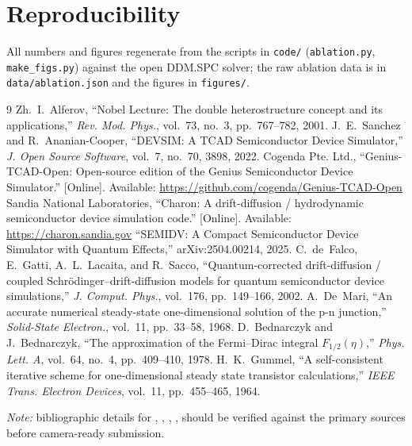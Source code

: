 \documentclass[conference]{IEEEtran}
\begin{document}
\section*{Reproducibility}
All numbers and figures regenerate from the scripts in \texttt{code/}
(\texttt{ablation.py}, \texttt{make\_figs.py}) against the open DDM.SPC solver; the
raw ablation data is in \texttt{data/ablation.json} and the figures in
\texttt{figures/}.

\begin{thebibliography}{9}
 Zh.~I.~Alferov, ``Nobel Lecture: The double heterostructure
concept and its applications,'' \emph{Rev. Mod. Phys.}, vol.~73, no.~3,
pp.~767--782, 2001.
 J.~E.~Sanchez and R.~Ananian-Cooper, ``DEVSIM: A TCAD
Semiconductor Device Simulator,'' \emph{J. Open Source Software}, vol.~7, no.~70,
3898, 2022.
 Cogenda Pte. Ltd., ``Genius-TCAD-Open: Open-source edition of the
Genius Semiconductor Device Simulator.'' [Online]. Available:
\url{https://github.com/cogenda/Genius-TCAD-Open}
 Sandia National Laboratories, ``Charon: A drift-diffusion /
hydrodynamic semiconductor device simulation code.'' [Online]. Available:
\url{https://charon.sandia.gov}
 ``SEMIDV: A Compact Semiconductor Device Simulator with Quantum
Effects,'' arXiv:2504.00214, 2025.
 C.~de~Falco, E.~Gatti, A.~L.~Lacaita, and R.~Sacco, ``Quantum-corrected
drift-diffusion / coupled Schr\"odinger--drift-diffusion models for quantum
semiconductor device simulations,'' \emph{J. Comput. Phys.}, vol.~176,
pp.~149--166, 2002.
 A.~De~Mari, ``An accurate numerical steady-state one-dimensional
solution of the p-n junction,'' \emph{Solid-State Electron.}, vol.~11,
pp.~33--58, 1968.
 D.~Bednarczyk and J.~Bednarczyk, ``The approximation of the
Fermi--Dirac integral $F_{1/2}(\eta)$,'' \emph{Phys. Lett. A}, vol.~64, no.~4,
pp.~409--410, 1978.
 H.~K.~Gummel, ``A self-consistent iterative scheme for
one-dimensional steady state transistor calculations,'' \emph{IEEE Trans.
Electron Devices}, vol.~11, pp.~455--465, 1964.
\end{thebibliography}

\vspace{2mm}
\footnotesize\emph{Note:} bibliographic details for \cite{charon}, \cite{qdd},
\cite{demari}, \cite{bednarczyk}, \cite{gummel} should be verified against the
primary sources before camera-ready submission.
\end{document}

